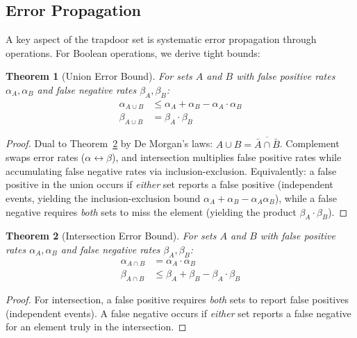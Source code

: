 \documentclass[10pt,conference]{IEEEtran}
\newtheorem{theorem}{Theorem}
\begin{document}
\subsection{Error Propagation}

A key aspect of the trapdoor set is systematic error propagation through operations. For Boolean operations, we derive tight bounds:

\begin{theorem}[Union Error Bound]
\label{thm:union}
For sets $A$ and $B$ with false positive rates $\alpha_A, \alpha_B$ and false negative rates $\beta_A, \beta_B$:
\begin{align}
\alpha_{A \cup B} &\leq \alpha_A + \alpha_B - \alpha_A \cdot \alpha_B \\
\beta_{A \cup B} &= \beta_A \cdot \beta_B
\end{align}
\end{theorem}

\begin{proof}
Dual to Theorem~\ref{thm:intersection} by De Morgan's laws: $A \cup B = \overline{\bar{A} \cap \bar{B}}$. Complement swaps error rates ($\alpha \leftrightarrow \beta$), and intersection multiplies false positive rates while accumulating false negative rates via inclusion-exclusion. Equivalently: a false positive in the union occurs if \emph{either} set reports a false positive (independent events, yielding the inclusion-exclusion bound $\alpha_A + \alpha_B - \alpha_A \alpha_B$), while a false negative requires \emph{both} sets to miss the element (yielding the product $\beta_A \cdot \beta_B$).
\end{proof}

\begin{theorem}[Intersection Error Bound]
\label{thm:intersection}
For sets $A$ and $B$ with false positive rates $\alpha_A, \alpha_B$ and false negative rates $\beta_A, \beta_B$:
\begin{align}
\alpha_{A \cap B} &= \alpha_A \cdot \alpha_B \\
\beta_{A \cap B} &\leq \beta_A + \beta_B - \beta_A \cdot \beta_B
\end{align}
\end{theorem}

\begin{proof}
For intersection, a false positive requires \emph{both} sets to report false positives (independent events). A false negative occurs if \emph{either} set reports a false negative for an element truly in the intersection.
\end{proof}
\end{document}

